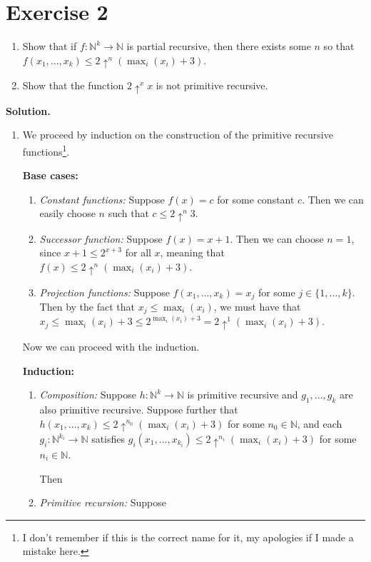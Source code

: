 \documentclass{article}
\newcommand{\nat}{\mathbb{N}}
\newcommand{\solution}{\noindent \textbf{Solution.}}
\begin{document}
\section*{Exercise 2}
\begin{enumerate}
    \item Show that if $f:\nat^k \to \nat$ is partial recursive, then there exists some $n$ so that $f(x_1, ..., x_k) \leq 2 \uparrow^n(\max_i(x_i)+3)$.
    \item Show that the function $2\uparrow^x x$ is not primitive recursive.
\end{enumerate}

\vspace{3mm}
\solution

\begin{enumerate}
    \item We proceed by induction on the construction of the primitive recursive functions\footnote{I don't remember if this is the correct name for it, my apologies if I made a mistake here.}.

    \textbf{Base cases:}

    \begin{enumerate}
        \item \textit{Constant functions:} Suppose $f(x) = c$ for some constant $c$.
        Then we can easily choose $n$ such that $c \leq 2\uparrow^n 3$.
        \item \textit{Successor function:} Suppose $f(x) = x + 1$.
        Then we can choose $n = 1$, since $x + 1 \leq 2^{x + 3}$ for all $x$, meaning that $f(x) \leq 2 \uparrow^n (\max_i(x_i) + 3)$.
        \item \textit{Projection functions:} Suppose $f(x_1, ..., x_k) = x_j$ for some $j \in \{1, ..., k\}$.
        Then by the fact that $x_j \leq \max_i(x_i)$, we must have that
        $x_j \leq \max_i(x_i) + 3 \leq 2^{\max_i(x_i) + 3} = 2\uparrow^1(\max_i(x_i) + 3)$.
    \end{enumerate}
    Now we can proceed with the induction.

    \textbf{Induction:}

    \begin{enumerate}
        \item \textit{Composition:} Suppose $h: \nat ^k \to \nat$ is primitive recursive and $g_1, ..., g_k$ are also primitive recursive.
        Suppose further that $h(x_1, ..., x_k) \leq 2\uparrow^{n_0}(\max_i(x_i)+ 3)$ for some $n_0 \in \nat$, and each $g_i : \nat^{k_i} \to \nat$ satisfies $g_i(x_1, ..., x_{k_i}) \leq 2\uparrow^{n_i}(\max_i(x_i) + 3)$ for some $n_i \in \nat$.

        Then 

        \item \textit{Primitive recursion:} Suppose 
    \end{enumerate}
    
\end{enumerate}
\end{document}
